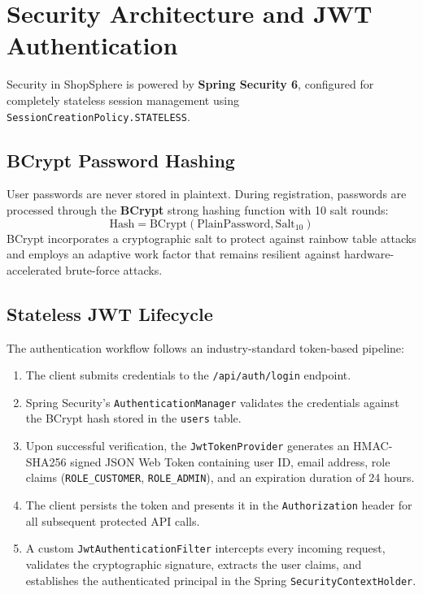 \section{Security Architecture and JWT Authentication}
Security in ShopSphere is powered by \textbf{Spring Security 6}, configured for completely stateless session management using \texttt{SessionCreationPolicy.STATELESS}.

\subsection{BCrypt Password Hashing}
User passwords are never stored in plaintext. During registration, passwords are processed through the \textbf{BCrypt} strong hashing function with 10 salt rounds:
\begin{equation}
\text{Hash} = \text{BCrypt}(\text{PlainPassword}, \text{Salt}_{10})
\end{equation}
BCrypt incorporates a cryptographic salt to protect against rainbow table attacks and employs an adaptive work factor that remains resilient against hardware-accelerated brute-force attacks.

\subsection{Stateless JWT Lifecycle}
The authentication workflow follows an industry-standard token-based pipeline:
\begin{enumerate}[leftmargin=2.0em]
    \item The client submits credentials to the \texttt{/api/auth/login} endpoint.
    \item Spring Security's \texttt{AuthenticationManager} validates the credentials against the BCrypt hash stored in the \texttt{users} table.
    \item Upon successful verification, the \texttt{JwtTokenProvider} generates an HMAC-SHA256 signed JSON Web Token containing user ID, email address, role claims (\texttt{ROLE\_CUSTOMER}, \texttt{ROLE\_ADMIN}), and an expiration duration of 24 hours.
    \item The client persists the token and presents it in the \texttt{Authorization} header for all subsequent protected API calls.
    \item A custom \texttt{JwtAuthenticationFilter} intercepts every incoming request, validates the cryptographic signature, extracts the user claims, and establishes the authenticated principal in the Spring \texttt{SecurityContextHolder}.
\end{enumerate}

